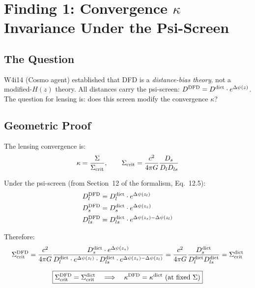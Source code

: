 \documentclass[11pt,a4paper]{article}
\newcommand{\Dpsi}{\Delta\psi}
\begin{document}
\section{Finding 1: Convergence $\kappa$ Invariance Under the Psi-Screen}
\label{sec:kappa-invariance}

\subsection{The Question}

W4i14 (Cosmo agent) established that DFD is a \emph{distance-bias theory},
not a modified-$H(z)$ theory.  All distances carry the psi-screen:
$D^{\rm DFD} = D^{\rm dict} \cdot e^{\Dpsi(z)}$.  The question for
lensing is: does this screen modify the convergence $\kappa$?

\subsection{Geometric Proof}

The lensing convergence is:
\begin{equation}
\kappa = \frac{\Sigma}{\Sigma_{\rm crit}}, \qquad
\Sigma_{\rm crit} = \frac{c^2}{4\pi G} \frac{D_s}{D_l D_{ls}}
\label{eq:sigma-crit}
\end{equation}

Under the psi-screen (from Section~12 of the formalism, Eq.~12.5):
\begin{align}
D_l^{\rm DFD} &= D_l^{\rm dict} \cdot e^{\Dpsi(z_l)} \\
D_s^{\rm DFD} &= D_s^{\rm dict} \cdot e^{\Dpsi(z_s)} \\
D_{ls}^{\rm DFD} &= D_{ls}^{\rm dict} \cdot e^{\Dpsi(z_s) - \Dpsi(z_l)}
\end{align}

Therefore:
\begin{equation}
\Sigma_{\rm crit}^{\rm DFD} = \frac{c^2}{4\pi G}
\frac{D_s^{\rm dict} \cdot e^{\Dpsi(z_s)}}
{D_l^{\rm dict} \cdot e^{\Dpsi(z_l)} \cdot D_{ls}^{\rm dict}
  \cdot e^{\Dpsi(z_s) - \Dpsi(z_l)}}
= \frac{c^2}{4\pi G} \frac{D_s^{\rm dict}}{D_l^{\rm dict} D_{ls}^{\rm dict}}
= \Sigma_{\rm crit}^{\rm dict}
\end{equation}

\begin{equation}
\boxed{
\Sigma_{\rm crit}^{\rm DFD} = \Sigma_{\rm crit}^{\rm dict}
\quad \Longrightarrow \quad
\kappa^{\rm DFD} = \kappa^{\rm dict} \text{ (at fixed $\Sigma$)}
}
\label{eq:kappa-invariant}
\end{equation}
\end{document}
